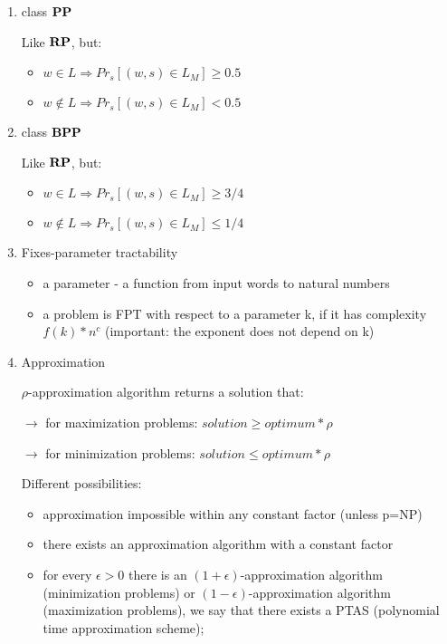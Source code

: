 \begin{enumerate}
    \item class $\textbf{PP}$
    
    Like $\textbf{RP}$, but:
    \begin{itemize}
        \item $w \in L \Rightarrow Pr_s[(w,s) \in L_M] \geq 0.5$
        \item $w \notin L \Rightarrow Pr_s[(w,s) \in L_M] < 0.5$
    \end{itemize}
    
    \item class $\textbf{BPP}$
    
    Like $\textbf{RP}$, but:
    \begin{itemize}
        \item $w \in L \Rightarrow Pr_s[(w,s) \in L_M] \geq 3/4$
        \item $w \notin L \Rightarrow Pr_s[(w,s) \in L_M] \leq 1/4$
    \end{itemize}
    
    \item Fixes-parameter tractability
    \begin{itemize}
        \item a parameter - a function from input words to natural numbers
        \item a problem is FPT with respect to a parameter k, if it has complexity $f(k)*n^c$ (important: the exponent does not depend on k)
    \end{itemize}
    
    \item Approximation
    
    $\rho$-approximation algorithm returns a solution that: 
    
    $\rightarrow$ for maximization problems: $solution \geq optimum*\rho$
    
    $\rightarrow$ for minimization problems: $solution \leq optimum*\rho$
    
    Different possibilities: 
    \begin{itemize}
        \item approximation impossible within any constant factor (unless p=NP)
        \item there exists an approximation algorithm with a constant factor
        \item for every $\epsilon > 0$ there is an $(1+\epsilon)$-approximation algorithm (minimization problems) or $(1-\epsilon)$-approximation algorithm (maximization problems), we say that there exists a PTAS (polynomial time approximation scheme);
        

\end{itemize}
\end{enumerate}
